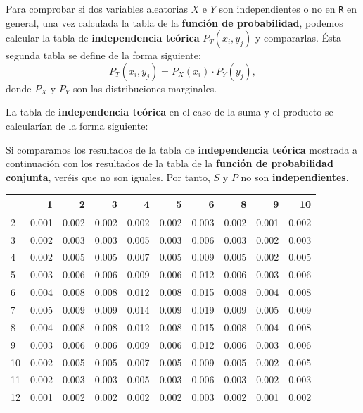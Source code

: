 \documentclass[]{book}
\newenvironment{Shaded}{\begin{snugshade}}{\end{snugshade}}
\newcommand{\KeywordTok}[1]{\textcolor[rgb]{0.13,0.29,0.53}{\textbf{#1}}}
\newcommand{\NormalTok}[1]{#1}
\newcommand{\OperatorTok}[1]{\textcolor[rgb]{0.81,0.36,0.00}{\textbf{#1}}}
\newcommand{\StringTok}[1]{\textcolor[rgb]{0.31,0.60,0.02}{#1}}
\begin{document}
Para comprobar si dos variables aleatorias \(X\) e \(Y\) son independientes o no en \texttt{R} en general, una vez calculada la tabla de la \textbf{función de probabilidad}, podemos calcular la tabla de \textbf{independencia teórica} \(P_T(x_i,y_j)\) y compararlas. Ésta segunda tabla se define de la forma siguiente:
\[
P_T(x_i,y_j)=P_X(x_i)\cdot P_Y(y_j),
\]
donde \(P_X\) y \(P_Y\) son las distribuciones marginales.

La tabla de \textbf{independencia teórica } en el caso de la suma y el producto se calcularían de la forma siguiente:

\begin{Shaded}
\end{Shaded}

Si comparamos los resultados de la tabla de \textbf{independencia teórica} mostrada a continuación con los resultados de la tabla de la \textbf{función de probabilidad conjunta}, veréis que no son iguales. Por tanto, \(S\) y \(P\) no son \textbf{independientes}.

\begin{tabular}{l|r|r|r|r|r|r|r|r|r}
\hline
  & 1 & 2 & 3 & 4 & 5 & 6 & 8 & 9 & 10\\
\hline
2 & 0.001 & 0.002 & 0.002 & 0.002 & 0.002 & 0.003 & 0.002 & 0.001 & 0.002\\
\hline
3 & 0.002 & 0.003 & 0.003 & 0.005 & 0.003 & 0.006 & 0.003 & 0.002 & 0.003\\
\hline
4 & 0.002 & 0.005 & 0.005 & 0.007 & 0.005 & 0.009 & 0.005 & 0.002 & 0.005\\
\hline
5 & 0.003 & 0.006 & 0.006 & 0.009 & 0.006 & 0.012 & 0.006 & 0.003 & 0.006\\
\hline
6 & 0.004 & 0.008 & 0.008 & 0.012 & 0.008 & 0.015 & 0.008 & 0.004 & 0.008\\
\hline
7 & 0.005 & 0.009 & 0.009 & 0.014 & 0.009 & 0.019 & 0.009 & 0.005 & 0.009\\
\hline
8 & 0.004 & 0.008 & 0.008 & 0.012 & 0.008 & 0.015 & 0.008 & 0.004 & 0.008\\
\hline
9 & 0.003 & 0.006 & 0.006 & 0.009 & 0.006 & 0.012 & 0.006 & 0.003 & 0.006\\
\hline
10 & 0.002 & 0.005 & 0.005 & 0.007 & 0.005 & 0.009 & 0.005 & 0.002 & 0.005\\
\hline
11 & 0.002 & 0.003 & 0.003 & 0.005 & 0.003 & 0.006 & 0.003 & 0.002 & 0.003\\
\hline
12 & 0.001 & 0.002 & 0.002 & 0.002 & 0.002 & 0.003 & 0.002 & 0.001 & 0.002\\
\hline
\end{tabular}
\end{document}
